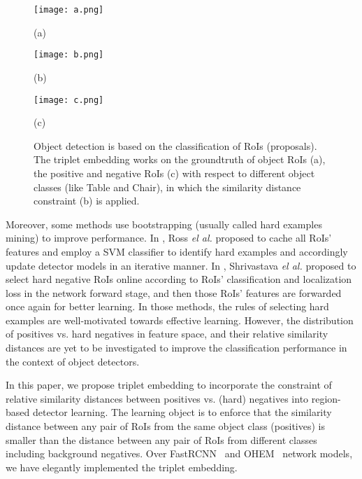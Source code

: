 \documentclass{article}
\begin{document}
{\begin{figure*}
\vspace{-5pt}
\begin{minipage}[t]{0.24\linewidth}
  \centering
\centerline{\texttt{[image: a.png]}}
  \centerline{(a)}
\end{minipage}
\begin{minipage}[t]{0.26\linewidth}
\centering
\centerline{\texttt{[image: b.png]}}
  \centerline{(b)}
\end{minipage}
\begin{minipage}[t]{0.49\linewidth}
\centering
\centerline{\texttt{[image: c.png]}}
  \centerline{(c)}
\end{minipage}
\vspace*{-5pt}
\caption{Object detection is based on the classification of RoIs (proposals). The triplet embedding works on the groundtruth of object RoIs (a), the positive and negative RoIs (c) with respect to different object classes (like Table and Chair), in which the similarity distance constraint (b) is applied. }
\vspace*{-15pt}
\label{fig:example}
\end{figure*}

Moreover, some methods use bootstrapping (usually called hard examples mining) to improve performance. In \cite{girshick2014rich}, Ross \textit{el al.} proposed to cache all RoIs' features and employ a SVM classifier to identify hard examples and accordingly update detector models in an iterative manner. In \cite{online_hard_example_mining}, Shrivastava \textit{el al.} proposed to select hard negative RoIs online according to RoIs' classification and localization loss in the network forward stage, and then those RoIs' features are forwarded once again for better learning. In those methods, the rules of selecting hard examples are well-motivated towards effective learning. However, the distribution of positives vs. hard negatives in feature space, and their relative similarity distances are yet to be investigated to improve the classification performance in the context of object detectors.


In this paper, we propose triplet embedding to incorporate the constraint of relative similarity distances between positives vs. (hard) negatives into region-based detector learning. The learning object is to enforce that the similarity distance between any pair of RoIs from the same object class (positives) is smaller than the distance between any pair of RoIs from different classes including background negatives. Over FastRCNN~\cite{girshick2015fast} and OHEM~\cite{online_hard_example_mining} network models, we have elegantly implemented the triplet embedding.

}
\end{document}
